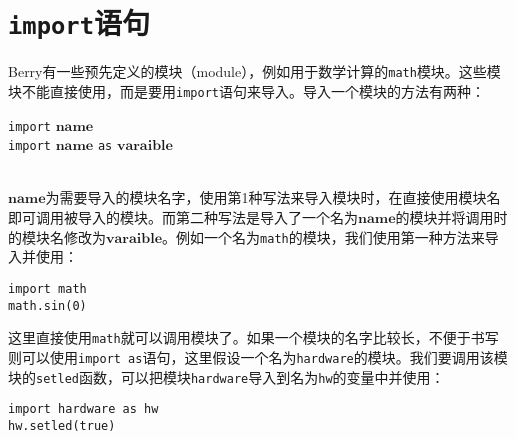 \section{\texttt{import}语句}

Berry有一些预先定义的模块（module），例如用于数学计算的\texttt{math}模块。这些模块不能直接使用，而是要用\texttt{import}语句来导入。导入一个模块的方法有两种：
\begin{algorithm}
    \texttt{import} $\bm{name}$ \\
    \texttt{import} $\bm{name}$ \texttt{as} $\bm{varaible}$
\end{algorithm}\vspace{-0.6em}\\
$\bm{name}$为需要导入的模块名字，使用第1种写法来导入模块时，在直接使用模块名即可调用被导入的模块。而第二种写法是导入了一个名为$\bm{name}$的模块并将调用时的模块名修改为$\bm{varaible}$。例如一个名为\texttt{math}的模块，我们使用第一种方法来导入并使用：
\begin{lstlisting}[language=berry, numbers=none]
import math
math.sin(0)
\end{lstlisting}
这里直接使用\texttt{math}就可以调用模块了。如果一个模块的名字比较长，不便于书写则可以使用\texttt{import as}语句，这里假设一个名为\texttt{hardware}的模块。我们要调用该模块的\texttt{setled}函数，可以把模块\texttt{hardware}导入到名为\texttt{hw}的变量中并使用：
\begin{lstlisting}[language=berry, numbers=none]
import hardware as hw
hw.setled(true)
\end{lstlisting}
